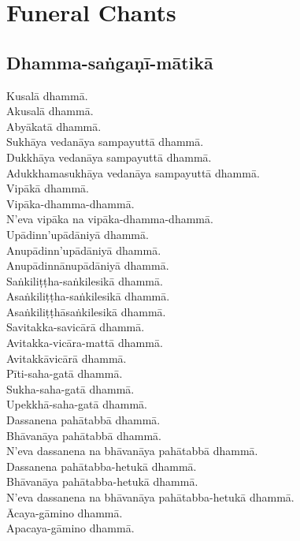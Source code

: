 \chapter{Funeral Chants}

\section{Dhamma-saṅgaṇī-mātikā}


Kusalā dhammā.\\
Akusalā dhammā.\\
Abyākatā dhammā.\\
Sukhāya vedanāya sampayuttā dhammā.\\
Dukkhāya vedanāya sampayuttā dhammā.\\
Adukkhamasukhāya vedanāya sampayuttā dhammā.\\
Vipākā dhammā.\\
Vipāka-dhamma-dhammā.\\
N'eva vipāka na vipāka-dhamma-dhammā.\\
Upādinn'upādāniyā dhammā.\\
Anupādinn'upādāniyā dhammā.\\
Anupādinnānupādāniyā dhammā.\\
Saṅkiliṭṭha-saṅkilesikā dhammā.\\
Asaṅkiliṭṭha-saṅkilesikā dhammā.\\
Asaṅkiliṭṭhāsaṅkilesikā dhammā.\\
Savitakka-savicārā dhammā.\\
Avitakka-vicāra-mattā dhammā.\\
Avitakkāvicārā dhammā.\\
Pīti-saha-gatā dhammā.\\
Sukha-saha-gatā dhammā.\\
Upekkhā-saha-gatā dhammā.\\
Dassanena pahātabbā dhammā.\\
Bhāvanāya pahātabbā dhammā.\\
N'eva dassanena na bhāvanāya pahātabbā dhammā.\\
Dassanena pahātabba-hetukā dhammā.\\
Bhāvanāya pahātabba-hetukā dhammā.\\
N'eva dassanena na bhāvanāya pahātabba-hetukā dhammā.\\
Ācaya-gāmino dhammā.\\
Apacaya-gāmino dhammā.\\
